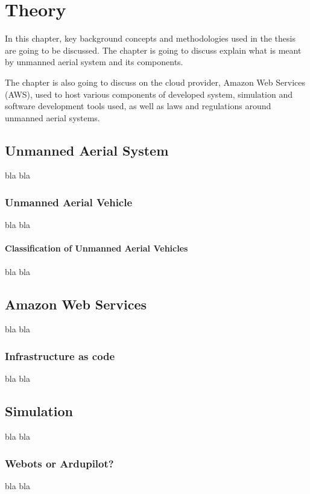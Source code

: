 
\chapter{Theory}

In this chapter, key background concepts and methodologies used in the thesis are going to be discussed. The chapter is going to discuss explain what is meant by unmanned aerial system and its components.

The chapter is also going to discuss on the cloud provider, Amazon Web Services (AWS), used to host various components of developed system, simulation and software development tools used, as well as laws and regulations around unmanned aerial systems.

\section{Unmanned Aerial System}
\label{sec:unmanned-aerial-system}

bla bla

\subsection{Unmanned Aerial Vehicle}
bla bla

\subsubsection{Classification of Unmanned Aerial Vehicles}
bla bla


\section{Amazon Web Services}
bla bla

\subsection{Infrastructure as code}
bla bla

\section{Simulation}
bla bla

\subsection{Webots or Ardupilot?}
bla bla

